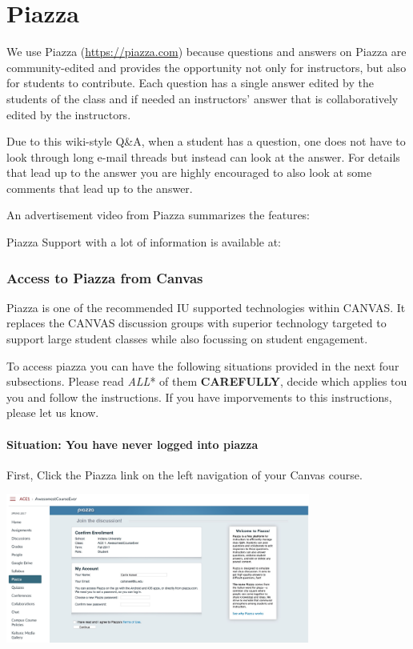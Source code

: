 \chapter{Piazza}\label{C:piazza}

\FILENAME

We use Piazza (\url{https://piazza.com}) because questions and answers
on Piazza are community-edited and provides the opportunity not only
for instructors, but also for students to contribute. Each question
has a single answer edited by the students of the class and if needed
an instructors' answer that is collaboratively edited by the
instructors.

Due to this wiki-style Q\&A, when a student has a question, one does not
have to look through long e-mail threads but instead can look at the
answer. For details that lead up to the answer you are highly encouraged
to also look at some comments that lead up to the answer.

An advertisement video from Piazza summarizes the features:


Piazza Support with a lot of information is available at:


\subsection{Access to Piazza from Canvas}

Piazza is one of the recommended IU supported technologies within
CANVAS. It replaces the CANVAS discussion groups with superior
technology targeted to support large student classes while also
focussing on student engagement.

To access piazza you can have the following situations provided in the
next four subsections. Please read \emph{ALL}* of them
\textbf{CAREFULLY}, decide which applies tou you and follow the
instructions. If you have imporvements to this instructions, please let
us know.

\subsubsection{Situation: You have never logged into piazza}

First, Click the Piazza link on the left navigation of your Canvas
course.

\includegraphics[width=0.75\textwidth]{images/piazza/image3.png}

